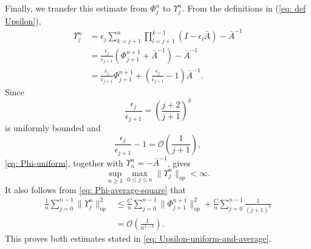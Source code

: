 \documentclass[11pt]{article}
\begin{document}
Finally, we transfer this estimate from $\Phi_j^n$ to $\Upsilon_j^n$.
From the definitions in (\ref{eq: def Upsilon}),
\begin{align*}
\Upsilon_j^n
&=
\epsilon_j\sum_{k=j+1}^{n}
\prod_{l=j+1}^{k-1}(I-\epsilon_l\bar A)
-\bar A^{-1}\\
&=
\frac{\epsilon_j}{\epsilon_{j+1}}
\left(\Phi_{j+1}^{n+1}+\bar A^{-1}\right)
-\bar A^{-1}\\
&=
\frac{\epsilon_j}{\epsilon_{j+1}}\Phi_{j+1}^{n+1}
+
\left(\frac{\epsilon_j}{\epsilon_{j+1}}-1\right)\bar A^{-1}.
\end{align*}
Since
\[
\frac{\epsilon_j}{\epsilon_{j+1}}
=
\left(\frac{j+2}{j+1}\right)^\delta
\]
is uniformly bounded and
\[
\frac{\epsilon_j}{\epsilon_{j+1}}-1
=
\mathcal O\!\left(\frac1{j+1}\right),
\]
\eqref{eq: Phi-uniform}, together with $\Upsilon_n^n=-\bar A^{-1}$, gives
\begin{equation}\label{eq: Upsilon-uniform}
    \sup_{n\geq1}\max_{0\leq j\leq n}\|\Upsilon_j^n\|_{op}<\infty.
\end{equation}
It also follows from \eqref{eq: Phi-average-square} that
\begin{align*}
\frac1n\sum_{j=0}^{n-1}\|\Upsilon_j^n\|_{op}^2
&\leq
\frac{C}{n}\sum_{j=0}^{n-1}\|\Phi_{j+1}^{n+1}\|_{op}^2
+
\frac{C}{n}\sum_{j=0}^{n-1}\frac1{(j+1)^2}\\
&=
\mathcal O\!\left(\frac1{n^{1-\delta}}\right).
\end{align*}
This proves both estimates stated in
\eqref{eq: Upsilon-uniform-and-average}.
\end{document}
